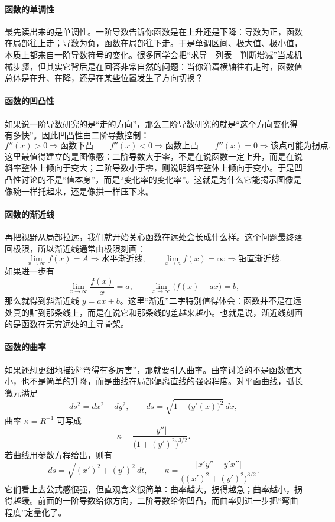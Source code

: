 \documentclass[UTF8]{ctexbook}
\begin{document}
\paragraph{函数的单调性}
最先读出来的是单调性。一阶导数告诉你函数是在上升还是下降：导数为正，函数在局部往上走；导数为负，函数在局部往下走。于是单调区间、极大值、极小值，本质上都来自一阶导数符号的变化。很多同学会把“求导—列表—判断增减”当成机械步骤，但其实它背后是在回答非常自然的问题：当你沿着横轴往右走时，函数值总体是在升、在降，还是在某些位置发生了方向切换？

\paragraph{函数的凹凸性}
如果说一阶导数研究的是“走的方向”，那么二阶导数研究的就是“这个方向变化得有多快”。因此凹凸性由二阶导数控制：
\[
f''(x)>0 \Rightarrow \text{函数下凸}
\qquad
f''(x)<0 \Rightarrow \text{函数上凸}
\qquad
f''(x)=0 \Rightarrow \text{该点可能为拐点}.
\]
这里最值得建立的是图像感：二阶导数大于零，不是在说函数一定上升，而是在说斜率整体上倾向于变大；二阶导数小于零，则说明斜率整体上倾向于变小。于是凹凸性讨论的不是“值本身”，而是“变化率的变化率”。这就是为什么它能揭示图像是像碗一样托起来，还是像拱一样压下来。

\paragraph{函数的渐近线}
再把视野从局部拉远，我们就开始关心函数在远处会长成什么样。这个问题最终落回极限，所以渐近线通常由极限刻画：
\[
\lim_{x\to\infty}f(x)=A \Rightarrow \text{水平渐近线},
\qquad
\lim_{x\to a}f(x)=\infty \Rightarrow \text{铅直渐近线}.
\]
如果进一步有
\[
\lim_{x\to\infty}\frac{f(x)}{x}=a,
\qquad
\lim_{x\to\infty}\bigl(f(x)-ax\bigr)=b,
\]
那么就得到斜渐近线 $y=ax+b$。这里“渐近”二字特别值得体会：函数并不是在远处真的贴到那条线上，而是在说它和那条线的差越来越小。也就是说，渐近线刻画的是函数在无穷远处的主导骨架。

\paragraph{函数的曲率}
如果还想更细地描述“弯得有多厉害”，那就要引入曲率。曲率讨论的不是函数值大小，也不是简单的升降，而是曲线在局部偏离直线的强弱程度。对平面曲线，弧长微元满足
\[
ds^2=dx^2+dy^2,
\qquad
 ds=\sqrt{1+\bigl(y'(x)\bigr)^2}\,dx,
\]
曲率 $\kappa=R^{-1}$ 可写成
\[
\kappa=\frac{|y''|}{\bigl(1+(y')^2\bigr)^{3/2}}.
\]
若曲线用参数方程给出，则有
\[
ds=\sqrt{(x')^2+(y')^2}\,dt,
\qquad
\kappa=\frac{|x'y''-y'x''|}{\bigl((x')^2+(y')^2\bigr)^{3/2}}.
\]
它们看上去公式感很强，但直观含义很简单：曲率越大，拐得越急；曲率越小，拐得越缓。前面的一阶导数给你方向，二阶导数给你凹凸，而曲率则进一步把“弯曲程度”定量化了。
\end{document}
